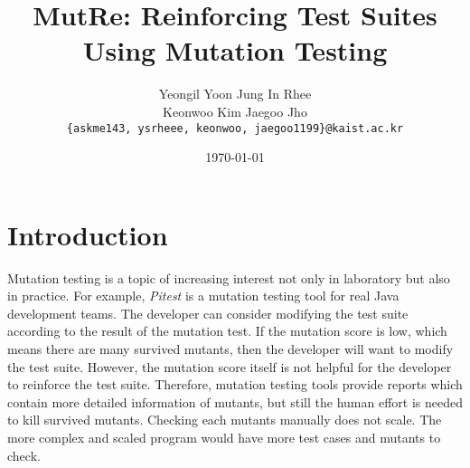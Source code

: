 \documentclass{article}
\title{\Huge\sffamily\titlefont MutRe: Reinforcing Test Suites\\Using Mutation Testing}
\author{\sffamily%
20180416 Yeongil Yoon \qquad 20180493 Jung In Rhee \\[0.4em]
\sffamily%
20170058 Keonwoo Kim \qquad 20170633 Jaegoo Jho\\[0.6em]
\texttt{\{askme143, ysrheee, keonwoo, jaegoo1199\}@kaist.ac.kr}
}
\date{\sffamily\today}
\begin{document}
\maketitle
\makeinfo

\iffalse
- 초록
 - 뮤테이션 테스팅은 테스트 suite의 품질을 확인해볼 수 있는 유용한 테스팅 방법이다.
 - 그러나 테스트 suite의 품질을 개선하는 데는 사람의 메뉴얼한 노력이 필요하며, 이는 scalable하지 않다.
 - 따라서 우리는 symbolic execution을 이용해 survived mutant를 자동으로 죽이는 MutRe를 제안한다.
 - Mutaion의 bytecode와 original code의 symbolic execution 결과를 SMT solver로 풀이하여 mutant를 죽이는 input condition을 알아내고, JUnit 형태의 test code를 제공한다.
 - Symbolic execution으로 부터 내려온 path explosion 문제가 있지만, 다양한 패턴의 코드를 handle할 수 있음을 확인했다.
\fi
{}

\makeabstract


\section{Introduction}
Mutation testing is a topic of increasing interest not only in laboratory but also in practice\cite{DevelopmentOfMutationTesting}.
For example, \emph{Pitest} \cite{Pitest} is a mutation testing tool for real Java development teams. The developer can consider modifying the test suite according to the result of the mutation test. If the mutation score is low, which means there are many survived mutants, then the developer will want to modify the test suite. However, the mutation score itself is not helpful for the developer to reinforce the test suite. Therefore, mutation testing tools provide reports which contain more detailed information of mutants, but still the human effort is needed to kill survived mutants. Checking each mutants manually does not scale. The more complex and scaled program would have more test cases and mutants to check.
\end{document}
